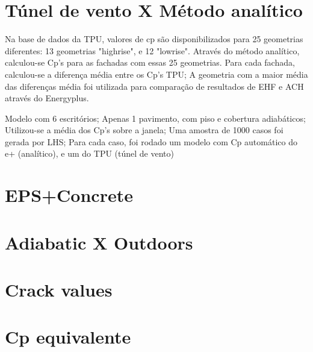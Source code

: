 \documentclass[12pt]{ufscthesis}
\begin{document}
	\maketitle
	
	
	\section{Túnel de vento X Método analítico}\label{TPU}
	Na base de dados da TPU, valores de cp são disponibilizados para 25 geometrias diferentes: 13 geometrias "highrise", e 12 "lowrise".
	Através do método analítico, calculou-se Cp’s para as fachadas com essas 25 geometrias.
	Para cada fachada, calculou-se a diferença média entre os Cp’s TPU;
	A geometria com a maior média das diferenças média foi utilizada para comparação de resultados de EHF e ACH através do Energyplus.
	
	Modelo com 6 escritórios;
	Apenas 1 pavimento, com piso e cobertura adiabáticos;
	Utilizou-se a média dos Cp’s sobre a janela;
	Uma amostra de 1000 casos foi gerada por LHS;
	Para cada caso, foi rodado um modelo com Cp automático do e+ (analítico), e um do TPU (túnel de vento)
	
	\section{EPS+Concrete}
	
	\section{Adiabatic X Outdoors}
	
	\section{Crack values}
	
	\section{Cp equivalente}
		
\end{document}
